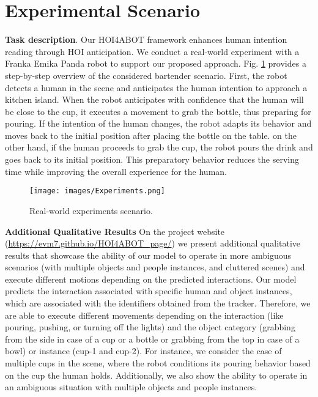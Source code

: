 \documentclass{article}
\begin{document}
\section{Experimental Scenario}
\label{apx:experimets}
\textbf{Task description}. Our HOI4ABOT framework enhances human intention reading through HOI anticipation. We conduct a real-world experiment with a Franka Emika Panda robot to support our proposed approach. Fig. \ref{fig:experiment_overview} provides a step-by-step overview of the considered bartender scenario. First, the robot detects a human in the scene and anticipates the human intention to approach a kitchen island.  When the robot anticipates with confidence that the human will be close to the cup, it executes a movement to grab the bottle, thus preparing for pouring. If the intention of the human changes, the robot adapts its behavior and moves back to the initial position after placing the bottle on the table. on the other hand, if the human proceeds to grab the cup, the robot pours the drink and goes back to its initial position. This preparatory behavior reduces the serving time while improving the overall experience for the human.

\begin{figure}[]
    \centering
    \texttt{[image: images/Experiments.png]}
    \caption{Real-world experiments scenario.}
    \label{fig:experiment_overview}
\end{figure}

\textbf{Additional Qualitative Results}
On the project website (\url{https://evm7.github.io/HOI4ABOT_page/}) we present additional qualitative results that showcase the ability of our model to operate in more ambiguous scenarios (with multiple objects and people instances, and cluttered scenes) and execute different motions depending on the predicted interactions. Our model predicts the interaction associated with specific human and object instances, which are associated with the identifiers obtained from the tracker. Therefore, we are able to execute different movements depending on the interaction (like pouring, pushing, or turning off the lights) and the object category (grabbing from the side in case of a cup or a bottle or grabbing from the top in case of a bowl) or instance (cup-1 and cup-2). For instance, we consider the case of multiple cups in the scene, where the robot conditions its pouring behavior based on the cup the human holds. Additionally, we also show the ability to operate in an ambiguous situation with multiple objects and people instances. 
\end{document}
